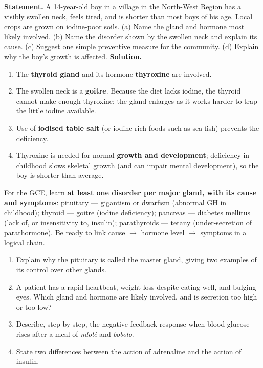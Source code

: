 \documentclass[11pt]{article}
\begin{document}
\begin{exoresolu}
\textbf{Statement.} A 14-year-old boy in a village in the North-West Region has a visibly swollen neck, feels tired, and is shorter than most boys of his age. Local crops are grown on iodine-poor soils. (a) Name the gland and hormone most likely involved. (b) Name the disorder shown by the swollen neck and explain its cause. (c) Suggest one simple preventive measure for the community. (d) Explain why the boy's growth is affected.
\tcblower
\textbf{Solution.}
\begin{enumerate}
\item The \textbf{thyroid gland} and its hormone \textbf{thyroxine} are involved.
\item The swollen neck is a \textbf{goitre}. Because the diet lacks iodine, the thyroid cannot make enough thyroxine; the gland enlarges as it works harder to trap the little iodine available.
\item Use of \textbf{iodised table salt} (or iodine-rich foods such as sea fish) prevents the deficiency.
\item Thyroxine is needed for normal \textbf{growth and development}; deficiency in childhood slows skeletal growth (and can impair mental development), so the boy is shorter than average.
\end{enumerate}
\end{exoresolu}

\begin{attention}
For the GCE, learn \textbf{at least one disorder per major gland, with its cause and symptoms}: pituitary --- gigantism or dwarfism (abnormal GH in childhood); thyroid --- goitre (iodine deficiency); pancreas --- diabetes mellitus (lack of, or insensitivity to, insulin); parathyroids --- tetany (under-secretion of parathormone). Be ready to link cause $\to$ hormone level $\to$ symptoms in a logical chain.
\end{attention}

\begin{exercice}
\begin{enumerate}
\item Explain why the pituitary is called the master gland, giving two examples of its control over other glands.
\item A patient has a rapid heartbeat, weight loss despite eating well, and bulging eyes. Which gland and hormone are likely involved, and is secretion too high or too low?
\item Describe, step by step, the negative feedback response when blood glucose rises after a meal of \emph{ndol\'e} and \emph{bobolo}.
\item State two differences between the action of adrenaline and the action of insulin.
\end{enumerate}
\end{exercice}
\end{document}
